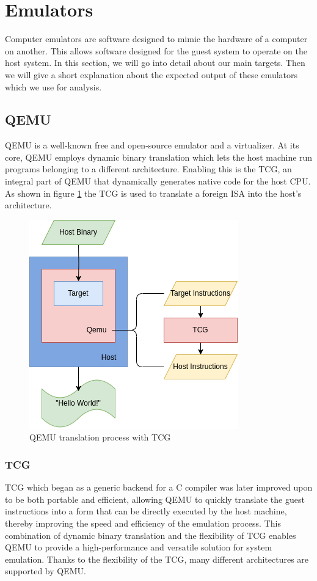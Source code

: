 \section{Emulators}

Computer emulators are software designed to mimic the hardware of a computer on another.
This allows software designed for the guest system to operate on the host system. 
In this section, we will go into detail about our main targets.
Then we will give a short explanation about the expected output of these emulators which we use for analysis.

\subsection{QEMU}
\ac{QEMU} is a well-known free and open-source emulator and a virtualizer. 
At its core, \ac{QEMU} employs dynamic binary translation which lets the host machine run programs belonging to a different architecture.
Enabling this is the \ac{TCG}, an integral part of \ac{QEMU} that dynamically generates native code for the host CPU.
As shown in figure \ref{fig:qemu_tcg} the \ac{TCG} is used to translate a foreign \ac{ISA} into the host's architecture.

\begin{figure}[ht]
    \centering
    \includegraphics[width=0.7\linewidth]{figures/qemu_TCG2}
    \caption[QEMU translation process]{\ac{QEMU} translation process with \ac{TCG}}
    \label{fig:qemu_tcg}
\end{figure}

\subsubsection{TCG}
\ac{TCG} \cite{qemu_tcg} which began as a generic backend for a C compiler was later improved upon to be both portable and efficient, allowing \ac{QEMU} to quickly translate the guest instructions into a form that can be directly executed by the host machine, thereby improving the speed and efficiency of the emulation process.
This combination of dynamic binary translation and the flexibility of \ac{TCG} enables \ac{QEMU} to provide a high-performance and versatile solution for system emulation.
Thanks to the flexibility of the \ac{TCG}, many different architectures are supported by \ac{QEMU}.

